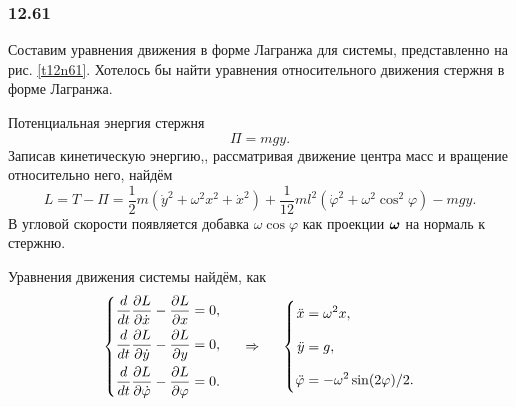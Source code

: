 \subsubsection*{12.61}

Составим уравнения движения в форме Лагранжа для системы, представленно на рис. \ref{t12n61}. Хотелось бы найти уравнения относительного движения стержня в форме Лагранжа.

Потенциальная энергия стержня
\begin{equation*}
    \Pi = mgy.
\end{equation*}
Записав кинетическую энергию,, рассматривая движение центра масс и вращение относительно него, найдём 
\begin{equation}
    L = T - \Pi = 
    \frac{1}{2} m \left(
        \dot{y}^2 + \omega^2 x^2 + \dot{x}^2
    \right) + 
    \frac{1}{12} m l^2 \left(
        \dot{\varphi}^2 + \omega^2 \cos^2 \varphi
    \right) - mgy.
\end{equation}
В угловой скорости появляется добавка $\omega \cos \varphi$ как проекции $\mbox{\boldmath $\omega$}$ на нормаль к стержню. 

Уравнения движения системы найдём, как
\begin{equation}
    \left\{\begin{aligned}
        \EqL{x},  \\
        \EqL{y}, \\
        \EqL{\varphi}.
    \end{aligned}\right.
    \hspace{0.5cm} \Rightarrow \hspace{0.5cm} 
    \left\{\begin{aligned}
       \vp  \ddot{x} &= \omega^2 x,\\
       \vp  \ddot{y} &= g, \\
       \vp  \ddot{\varphi} &= -  \omega^2 \sin (2 \varphi) / 2.
    \end{aligned}\right.
\end{equation}